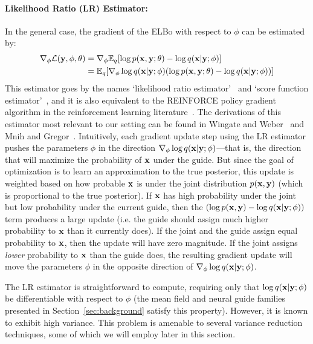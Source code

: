 \paragraph{Likelihood Ratio (LR) Estimator:}
In the general case, the gradient of the ELBo with respect to $\phi$ can be estimated by:
\begin{align}
\begin{split}
\nabla_\phi \mathcal{L}(\mathbf{y}, \phi, \theta)
&= \nabla_\phi \mathbb{E}_{q}[ \log p(\mathbf{x}, \mathbf{y}; \theta) - \log q(\mathbf{x} | \mathbf{y} ; \phi) ]\\
&= \mathbb{E}_{q}[ \nabla_\phi \log q(\mathbf{x} | \mathbf{y} ; \phi) ( \log p(\mathbf{x}, \mathbf{y}; \theta) - \log q(\mathbf{x} | \mathbf{y} ; \phi) ) ]
\end{split}
\label{eq:lr}
\end{align}
This estimator goes by the names `likelihood ratio estimator'~\cite{LikelihoodRatioEstimator} and `score function estimator'~\cite{ScoreFunctionEstimator}, and it is also equivalent to the REINFORCE policy gradient algorithm in the reinforcement learning literature~\cite{REINFORCE}. The derivations of this estimator most relevant to our setting can be found in Wingate and Weber~\cite{AVIPP} and Mnih and Gregor~\cite{NVIL}.
Intuitively, each gradient update step using the LR estimator pushes the parameters $\phi$ in the direction $\nabla_\phi \log q(\mathbf{x} | \mathbf{y} ; \phi)$---that is, the direction that will maximize the probability of $\mathbf{x}$ under the guide. But since the goal of optimization is to learn an approximation to the true posterior, this update is weighted based on how probable $\mathbf{x}$ is under the joint distribution $p(\mathbf{x}, \mathbf{y})$ (which is proportional to the true posterior). If $\mathbf{x}$ has high probability under the joint but low probability under the current guide, then the $( \log p(\mathbf{x}, \mathbf{y}) - \log q(\mathbf{x} | \mathbf{y} ; \phi) )$ term produces a large update (i.e. the guide should assign much higher probability to $\mathbf{x}$ than it currently does). If the joint and the guide assign equal probability to $\mathbf{x}$, then the update will have zero magnitude. If the joint assigns \emph{lower} probability to $\mathbf{x}$ than the guide does, the resulting gradient update will move the parameters $\phi$ in the opposite direction of $\nabla_\phi \log q(\mathbf{x} | \mathbf{y} ; \phi)$.

The LR estimator is straightforward to compute, requiring only that $\log q(\mathbf{x} | \mathbf{y} ; \phi)$ be differentiable with respect to $\phi$ (the mean field and neural guide families presented in Section~\ref{sec:background} satisfy this property). However, it is known to exhibit high variance. This problem is amenable to several variance reduction techniques, some of which we will employ later in this section.


